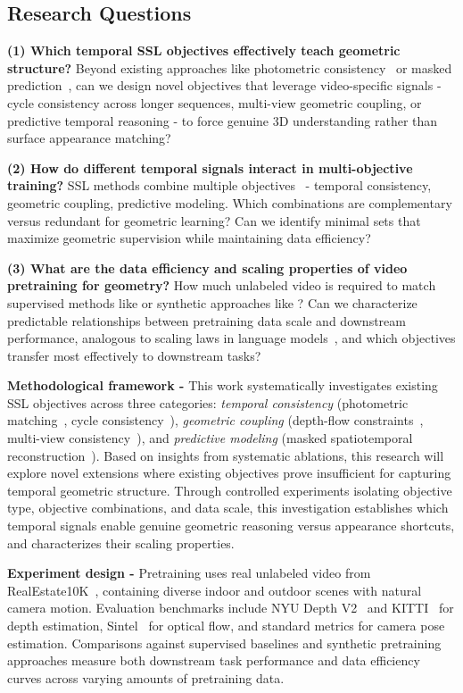 \documentclass{article}
\begin{document}
\subsection{Research Questions}

\textbf{(1) Which temporal SSL objectives effectively teach geometric structure?} Beyond existing approaches like photometric consistency~\cite{godard2019} or masked prediction~\cite{videomae}, can we design novel objectives that leverage video-specific signals - cycle consistency across longer sequences, multi-view geometric coupling, or predictive temporal reasoning - to force genuine 3D understanding rather than surface appearance matching?

\textbf{(2) How do different temporal signals interact in multi-objective training?} SSL methods combine multiple objectives~\cite{dino,videomae} - temporal consistency, geometric coupling, predictive modeling. Which combinations are complementary versus redundant for geometric learning? Can we identify minimal sets that maximize geometric supervision while maintaining data efficiency?

\textbf{(3) What are the data efficiency and scaling properties of video pretraining for geometry?} How much unlabeled video is required to match supervised methods like \cite{vggt} or synthetic approaches like \cite{geo4d}? Can we characterize predictable relationships between pretraining data scale and downstream performance, analogous to scaling laws in language models~\cite{scaling_laws}, and which objectives transfer most effectively to downstream tasks?


\textbf{Methodological framework - }This work systematically investigates existing SSL objectives across three categories: \textit{temporal consistency} (photometric matching~\cite{godard2019}, cycle consistency~\cite{cyclesfm}), \textit{geometric coupling} (depth-flow constraints~\cite{geonet}, multi-view consistency~\cite{vggt}), and \textit{predictive modeling} (masked spatiotemporal reconstruction~\cite{videomae}). Based on insights from systematic ablations, this research will explore novel extensions where existing objectives prove insufficient for capturing temporal geometric structure. Through controlled experiments isolating objective type, objective combinations, and data scale, this investigation establishes which temporal signals enable genuine geometric reasoning versus appearance shortcuts, and characterizes their scaling properties.

\textbf{Experiment design - }Pretraining uses real unlabeled video from RealEstate10K~\cite{realestate10k}, containing diverse indoor and outdoor scenes with natural camera motion. Evaluation benchmarks include NYU Depth V2~\cite{nyu} and KITTI~\cite{kitti} for depth estimation, Sintel~\cite{sintel} for optical flow, and standard metrics for camera pose estimation. Comparisons against supervised baselines \cite{vggt} and synthetic pretraining approaches \cite{geo4d} measure both downstream task performance and data efficiency curves across varying amounts of pretraining data.
\end{document}
